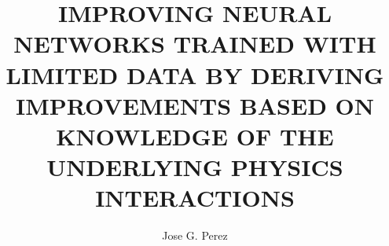 \documentclass[12pt]{report}
\title{IMPROVING NEURAL NETWORKS TRAINED WITH LIMITED DATA BY DERIVING IMPROVEMENTS BASED ON KNOWLEDGE OF THE UNDERLYING PHYSICS INTERACTIONS}
\author{Jose G. Perez}
\begin{document}
\makesigpage
\maketitlepage
\tableofcontents









\printbibliography

% 
\end{document}
